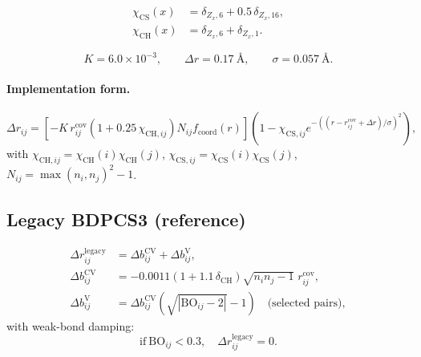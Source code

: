 \documentclass[a4paper,11pt]{article}
\begin{document}
\begin{align}
\chi_{\mathrm{CS}}(x)&=\delta_{Z_x,6}+0.5\,\delta_{Z_x,16},\\
\chi_{\mathrm{CH}}(x)&=\delta_{Z_x,6}+\delta_{Z_x,1}.
\end{align}

\begin{equation}
K=6.0\times10^{-3},\qquad
\Delta r=0.17~\text{\AA},\qquad
\sigma=0.057~\text{\AA}.
\end{equation}

\paragraph{Implementation form.}
\begin{equation}
\Delta r_{ij}
=\left[-K\,r^{\mathrm{cov}}_{ij}(1+0.25\,\chi_{\mathrm{CH},ij})N_{ij}f_{\mathrm{coord}}(r)\right]
\left(1-\chi_{\mathrm{CS},ij}e^{-((r-r^{\mathrm{cov}}_{ij}+\Delta r)/\sigma)^2}\right),
\end{equation}
with $\chi_{\mathrm{CH},ij}=\chi_{\mathrm{CH}}(i)\chi_{\mathrm{CH}}(j)$,
$\chi_{\mathrm{CS},ij}=\chi_{\mathrm{CS}}(i)\chi_{\mathrm{CS}}(j)$,
$N_{ij}=\max(n_i,n_j)^2-1$.

\subsection{Legacy BDPCS3 (reference)}
\begin{align}
\Delta r^{\mathrm{legacy}}_{ij} &= \Delta b^{\mathrm{CV}}_{ij}+\Delta b^{\mathrm{V}}_{ij},\\
\Delta b^{\mathrm{CV}}_{ij}
&= -0.0011\left(1+1.1\,\delta_{\mathrm{CH}}\right)\sqrt{n_i n_j-1}\;r^{\mathrm{cov}}_{ij},\\
\Delta b^{\mathrm{V}}_{ij}
&= \Delta b^{\mathrm{CV}}_{ij}\left(\sqrt{|\mathrm{BO}_{ij}-2|}-1\right)
\quad\text{(selected pairs)},
\end{align}
with weak-bond damping:
\begin{equation}
\mathrm{if}\ \mathrm{BO}_{ij}<0.3,\quad \Delta r^{\mathrm{legacy}}_{ij}=0.
\end{equation}
\end{document}
